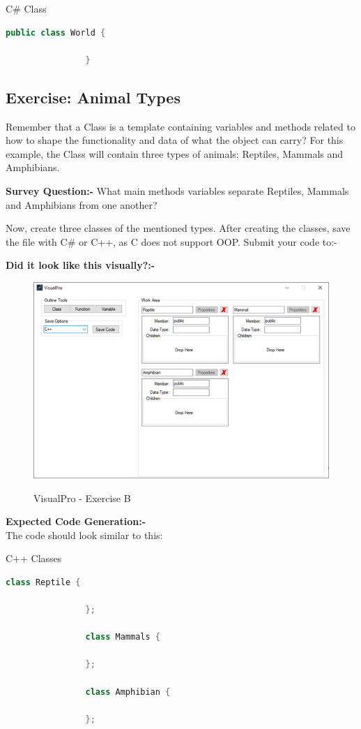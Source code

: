 \documentclass[10pt]{article}
\begin{document}
        \begin{example}{C\# Class}
            \begin{lstlisting}[language=java]
                public class World {

                }
            \end{lstlisting}
        \end{example}
    \newpage
    \subsection{Exercise: Animal Types}
        Remember that a Class is a template containing variables and methods related to how to shape the functionality and data of what the object can carry? For this example, the Class will contain three types of animals: Reptiles, Mammals and Amphibians.
        
        \textbf{Survey Question:-} What main methods variables separate Reptiles, Mammals and Amphibians from one another?

        Now, create three classes of the mentioned types. After creating the classes, save the file with C\# or C++, as C does not support OOP. Submit your code to:-

        \textbf{Did it look like this visually?:-} 
        \begin{figure}[h]
            \centering
            {\includegraphics[scale=0.75]{Figures/Exercises/SecC-1.png}}
            \caption{VisualPro - Exercise B}
            \label{fig:vp-eB}
        \end{figure}

        \textbf{Expected Code Generation:-}\\
        The code should look similar to this:
        \begin{example}{C++ Classes}
            \begin{lstlisting}[language=c++]
                class Reptile {

                };

                class Mammals {

                };

                class Amphibian {

                };
            \end{lstlisting}
        \end{example}
\end{document}
